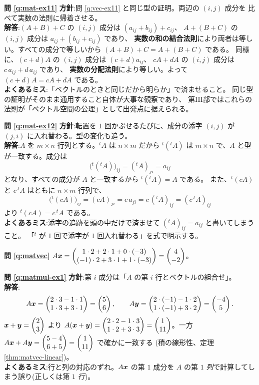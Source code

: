 \bigskip
\noindent\textbf{問 \ref{q:mat-ex11}}\quad
\textbf{方針}:問 \ref{q:vec-ex11} と同じ型の証明。両辺の $(i,j)$ 成分を
比べて実数の法則に帰着させる。\\
\textbf{解答}:$(A + B) + C$ の $(i,j)$ 成分は $(a_{ij} + b_{ij}) + c_{ij}$、
$A + (B + C)$ の $(i,j)$ 成分は $a_{ij} + (b_{ij} + c_{ij})$ であり、
\textbf{実数の和の結合法則}により両者は等しい。すべての成分で等しいから
$(A + B) + C = A + (B + C)$ である。
同様に、$(c + d)A$ の $(i,j)$ 成分は $(c + d)a_{ij}$、
$cA + dA$ の $(i,j)$ 成分は $c\,a_{ij} + d\,a_{ij}$ であり、
\textbf{実数の分配法則}により等しい。よって $(c + d)A = cA + dA$ である。\\
\textbf{よくあるミス}:「ベクトルのときと同じだから明らか」で済ませること。
同じ型の証明がそのまま通用すること自体が大事な観察であり、
第III部ではこれらの法則が「ベクトル空間の公理」として出発点に据えられる。

\bigskip
\noindent\textbf{問 \ref{q:mat-ex12}}\quad
\textbf{方針}:転置を $1$ 回かぶせるたびに、成分の添字 $(i,j)$ が
$(j,i)$ に入れ替わる。型の変化も追う。\\
\textbf{解答}:$A$ を $m \times n$ 行列とする。${}^t\!A$ は $n \times m$
だから ${}^t({}^t\!A)$ は $m \times n$ で、$A$ と型が一致する。成分は
\[
\bigl({}^t({}^t\!A)\bigr)_{ij} = ({}^t\!A)_{ji} = a_{ij}
\]
となり、すべての成分が $A$ と一致するから ${}^t({}^t\!A) = A$ である。
また、${}^t(cA)$ と $c\,{}^t\!A$ はともに $n \times m$ 行列で、
\[
\bigl({}^t(cA)\bigr)_{ij} = (cA)_{ji} = c\,a_{ji} = c\,({}^t\!A)_{ij}
= (c\,{}^t\!A)_{ij}
\]
より ${}^t(cA) = c\,{}^t\!A$ である。\\
\textbf{よくあるミス}:添字の追跡を頭の中だけで済ませて
$({}^t\!A)_{ij} = a_{ij}$ と書いてしまうこと。
「${}^t$ が $1$ 回で添字が $1$ 回入れ替わる」を式で明示する。

\bigskip
\noindent\textbf{問 \ref{q:matvec}}\quad
$A\bm{x} = \begin{pmatrix}1 \cdot 2 + 2 \cdot 1 + 0 \cdot (-3) \\
(-1) \cdot 2 + 3 \cdot 1 + 1 \cdot (-3)\end{pmatrix} = \begin{pmatrix}4 \\ -2\end{pmatrix}$。

\bigskip
\noindent\textbf{問 \ref{q:matmul-ex1}}\quad
\textbf{方針}:第 $i$ 成分は「$A$ の第 $i$ 行とベクトルの組合せ」。\\
\textbf{解答}:
\[
A\bm{x} = \begin{pmatrix}2 \cdot 3 - 1 \cdot 1 \\ 1 \cdot 3 + 3 \cdot 1\end{pmatrix} = \begin{pmatrix}5 \\ 6\end{pmatrix},
\qquad
A\bm{y} = \begin{pmatrix}2 \cdot (-1) - 1 \cdot 2 \\ 1 \cdot (-1) + 3 \cdot 2\end{pmatrix}
= \begin{pmatrix}-4 \\ 5\end{pmatrix}.
\]
$\bm{x} + \bm{y} = \begin{pmatrix}2 \\ 3\end{pmatrix}$ より
$A(\bm{x} + \bm{y}) = \begin{pmatrix}2 \cdot 2 - 1 \cdot 3 \\ 1 \cdot 2 + 3 \cdot 3\end{pmatrix}
= \begin{pmatrix}1 \\ 11\end{pmatrix}$。一方
$A\bm{x} + A\bm{y} = \begin{pmatrix}5 - 4 \\ 6 + 5\end{pmatrix} = \begin{pmatrix}1 \\ 11\end{pmatrix}$ で確かに一致する
(積の線形性、定理 \ref{thm:matvec-linear})。\\
\textbf{よくあるミス}:行と列の対応のずれ。$A\bm{x}$ の第 $1$ 成分を
$A$ の第 $1$ \emph{列}で計算してしまう誤り(正しくは第 $1$ \emph{行})。

